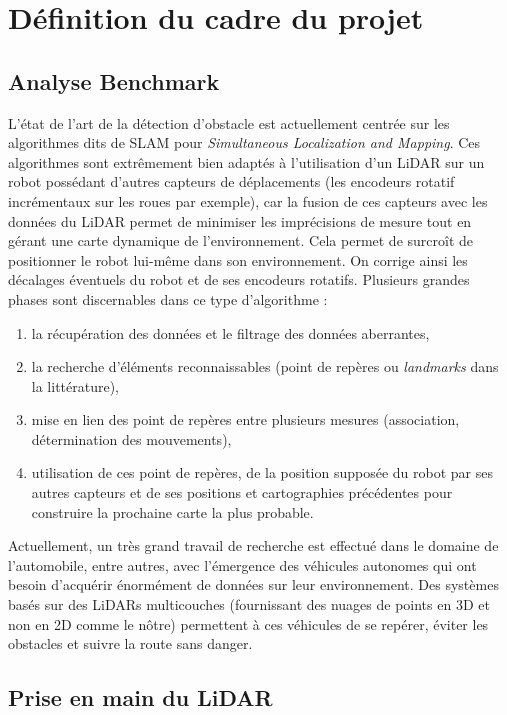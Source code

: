 \section{Définition du cadre du projet}

\subsection{Analyse Benchmark}

\tab L'état de l'art de la détection d'obstacle est actuellement centrée sur les algorithmes dits de SLAM pour \textit{Simultaneous Localization and Mapping}\cite{slam-nexter}. Ces algorithmes sont extrêmement bien adaptés à l'utilisation d'un LiDAR sur un robot possédant d'autres capteurs de déplacements (les encodeurs rotatif incrémentaux sur les roues par exemple), car la fusion de ces capteurs avec les données du LiDAR permet de minimiser les imprécisions de mesure tout en gérant une carte dynamique de l'environnement. Cela permet de surcroît de positionner le robot lui-même dans son environnement. On corrige ainsi les décalages éventuels du robot et de ses encodeurs rotatifs. Plusieurs grandes phases sont discernables dans ce type d'algorithme :

\begin{enumerate}
    \item la récupération des données et le filtrage des données aberrantes,
    \item la recherche d'éléments reconnaissables (point de repères ou \textit{landmarks} dans la littérature),
    \item mise en lien des point de repères entre plusieurs mesures (association, détermination des mouvements),
    \item utilisation de ces point de repères, de la position supposée du robot par ses autres capteurs et de ses positions et cartographies précédentes pour construire la prochaine carte la plus probable.
\end{enumerate}

Actuellement, un très grand travail de recherche est effectué dans le domaine de l'automobile, entre autres, avec l'émergence des véhicules autonomes qui ont besoin d'acquérir énormément de données sur leur environnement. Des systèmes basés sur des LiDARs multicouches (fournissant des nuages de points en 3D et non en 2D comme le nôtre) permettent à ces véhicules de se repérer, éviter les obstacles et suivre la route sans danger.

\subsection{Prise en main du LiDAR}
